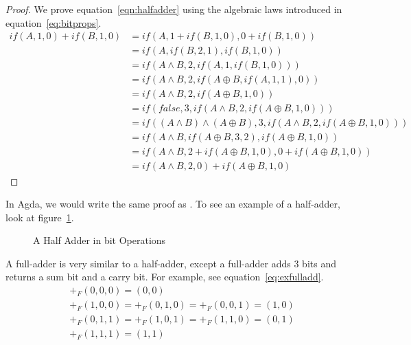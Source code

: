 \documentclass[14pt]{extarticle}  %
\begin{document}
\begin{proof}
  We prove equation~\ref{eqn:halfadder} using the algebraic laws introduced in equation~\ref{eq:bitprops}.
  \begin{align*}
    if(A, 1, 0) + if(B, 1,0)
    &= if(A, 1 + if(B,1,0), 0 + if(B, 1,0)) \\
    &= if(A, if(B, 2,1), if(B,1,0)) \\
    &= if(A \land B, 2, if(A, 1 , if(B,1,0))) \\
    &= if(A \land B, 2, if(A \oplus B, if(A,1,1), 0))\\
    &=if(A \land B, 2 , if(A \oplus B, 1, 0))\\
    &=if(false, 3, if(A \land B , 2 , if (A \oplus B , 1 , 0))) \\
    &=if((A\land B) \land (A \oplus B), 3, if(A \land B , 2 , if (A \oplus B , 1 , 0))) \\
    &=if(A\land B,if(A \oplus B , 3 , 2)  , if(A \oplus B , 1 , 0) ) \\
    &=if(A\land B, 2 + if(A \oplus B , 1 , 0)  ,  0 + if(A \oplus B , 1 , 0) ) \\
    &=if(A\land B, 2 ,  0  ) + if(A \oplus B , 1 , 0)
\end{align*}
\end{proof}
In Agda, we would write the same proof as .
To see an example of a half-adder, look at figure~\ref{fig:halfadder}.
 \begin{figure}[!h]
   \centering
   \caption{A Half Adder in bit Operations}
   \label{fig:halfadder}
\end{figure}


A full-adder is very similar to a half-adder, except a full-adder adds $3$ bits and returns a sum bit and a carry bit. For example, see equation~\ref{eq:exfulladd}.
\begin{align}\label{eq:exfulladd}
  &+_{F}(0,0,0) = (0,0) \\
  &+_{F}(1,0,0) = +_{F}(0,1,0) = +_{F}(0,0,1) = (1,0) \\
  &+_{F}(0,1,1) = +_{F}(1,0,1) = +_{F}(1,1,0) = (0,1) \\
  &+_{F}(1,1,1) = (1,1)
\end{align}
\end{document}

